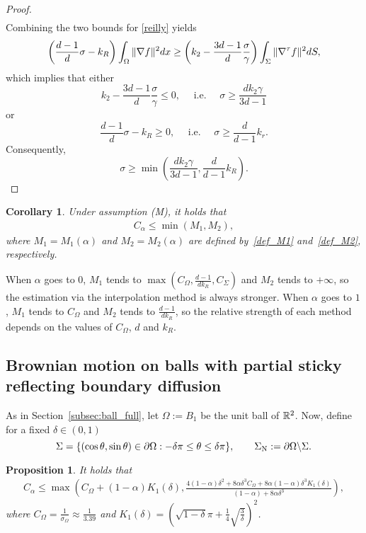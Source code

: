 \documentclass[a4paper]{article}
\newtheorem{corollary}[theorem]{Corollary}
\newtheorem{proposition}[theorem]{Proposition}
\theoremstyle{definition}
\numberwithin{equation}{section}
\begin{document}
\begin{proof}
\begin{align*}
 \end{align*}
Combining the two bounds  for \eqref{reilly} yields 
\[ \left(\frac {d-1}{d } \sigma - k_R \right) \int_\Omega \|\nabla f\|^2 dx \geq \left(k_2-\frac {3d-1}{d} \frac \sigma \gamma \right) \int_\Sigma \|\nabla^\tau f\| ^2 dS,\]
which implies that either 
\[ k_2 - \frac {3d-1}d \frac {\sigma}\gamma \leq 0,\quad \mbox{ i.e. }\quad  \sigma \geq \frac {d k_2 \gamma }{3 d -1 }\]
or 
\[ \frac{d-1}{d}\sigma - k_R \geq 0,\quad \mbox{ i.e. }\quad\sigma  \geq  \frac {d}{d-1}k_r.\]
Consequently, 
\[ \sigma \geq \min\left(\frac {d k_2 \gamma }{3 d -1 },\frac {d}{d-1}k_R\right). \]
\end{proof}

\begin{corollary}
Under assumption  (M), it holds that
\begin{align*}
    C_\alpha \leq \min (M_1,M_2),
\end{align*}
where $M_1=M_1(\alpha)$ and $M_2=M_2(\alpha)$ are defined by~\eqref{def_M1} and~\eqref{def_M2}, respectively. 
\end{corollary}

When $\alpha$ goes to 0, $M_1$ tends to $\max(C_\Omega,\frac{d-1}{dk_R},C_\Sigma)$ and $M_2$ tends to $+\infty$, so the estimation via the interpolation method is always stronger. 
When $\alpha$ goes to $1$, $M_1$ tends to $C_\Omega$ and $M_2$ tends to $\frac{d-1}{dk_R}$, so the relative strength of each method depends on the values of $C_\Omega$, $d$ and $k_R$. 



\subsection{Brownian motion on balls with partial sticky reflecting boundary diffusion}
\label{subsec:partial_ball}

As in Section~\ref{subsec:ball_full}, let  $\Omega:= B_1$ be the unit ball of $\mathbb{R}^2$. Now, define for a fixed 
 $\delta \in (0,1)$  
\[
\Sigma=\{ (\cos \theta, \sin \theta) \in \partial\Omega: -\delta \pi \leq \theta \leq \delta \pi\}, \quad \quad \Sigma_{\operatorname{N}}:=\partial \Omega \backslash \Sigma.
\]

\begin{proposition}
\label{prop_partial_sphere} It holds that 
\begin{align}
\label{estim_partial}
C_\alpha \leq
\max \left( 
C_\Omega + (1-\alpha)K_1(\delta), 
\frac{4(1-\alpha) \delta^2+8 \alpha \delta^3 C_\Omega +8 \alpha (1-\alpha) \delta^3 K_1(\delta)  }{(1-\alpha) + 8 \alpha \delta^3 }
\right),
\end{align}
where $C_\Omega = \frac{1}{\sigma_{\Omega}}\approx\frac{1}{3.39}$  and $K_1(\delta)= \left( \sqrt{1-\delta}\pi + \frac{1}{4}\sqrt{\frac{3}{\delta}} \right)^2$.
\end{proposition}
\end{document}
